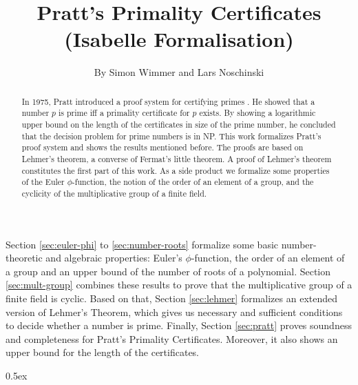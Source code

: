 \documentclass[11pt,a4paper]{article}
\begin{document}
\title{Pratt's Primality Certificates \\ (Isabelle Formalisation)}
\author{By Simon Wimmer and Lars Noschinski}
\maketitle

\begin{abstract}
  In 1975, Pratt introduced a proof system for certifying primes
  \cite{pratt1975certificate}.
  He showed that a number $p$ is prime iff a primality certificate for $p$ exists.
  By showing a logarithmic upper bound on the length of the certificates in size of the prime number,
  he concluded that the decision problem for prime numbers is in NP.
  This work formalizes Pratt's proof system and shows the results mentioned before.  
  The proofs are based on Lehmer's theorem, a converse of Fermat's little theorem.
  A proof of Lehmer's theorem constitutes the first part of this work.
  As a side product we formalize
  some properties of the Euler $\phi$-function,
  the notion of the order of an element of a group,
  and the cyclicity of the multiplicative group of a finite field.
\end{abstract}

\tableofcontents

Section \ref{sec:euler-phi} to \ref{sec:number-roots} formalize some basic number-theoretic
and algebraic properties: Euler's $\phi$-function, the order of an element of a group
and an upper bound of the number of roots of a polynomial. Section \ref{sec:mult-group}
combines these results to prove that the multiplicative group of a finite field is cyclic.
Based on that, Section \ref{sec:lehmer} formalizes an extended version of Lehmer's Theorem,
which gives us necessary and sufficient conditions to decide whether a number is prime.
Finally, Section \ref{sec:pratt} proves soundness and completeness for Pratt's Primality
Certificates. Moreover, it also shows an upper bound for the length of the certificates.

\parindent 0pt\parskip 0.5ex



\nocite{*}



\end{document}
